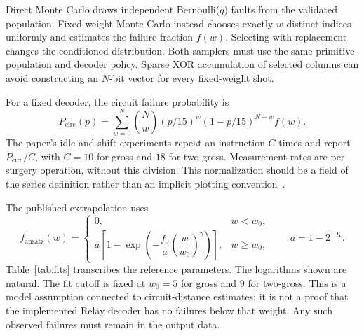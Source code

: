 \documentclass[11pt,a4paper]{article}
\begin{document}
Direct Monte Carlo draws independent Bernoulli($q$) faults from the validated population. Fixed-weight Monte Carlo instead chooses exactly $w$ distinct indices uniformly and estimates the failure fraction $f(w)$. Selecting with replacement changes the conditioned distribution. Both samplers must use the same primitive population and decoder policy. Sparse XOR accumulation of selected columns can avoid constructing an $N$-bit vector for every fixed-weight shot.

For a fixed decoder, the circuit failure probability is
\begin{equation}
 P_{\mathrm{circ}}(p)=\sum_{w=0}^N
 \binom Nw (p/15)^w(1-p/15)^{N-w}f(w).
 \label{eq:mixture}
\end{equation}
The paper's idle and shift experiments repeat an instruction $C$ times and report $P_{\mathrm{circ}}/C$, with $C=10$ for gross and $18$ for two-gross. Measurement rates are per surgery operation, without this division. This normalization should be a field of the series definition rather than an implicit plotting convention~\cite{tdg}.

The published extrapolation uses
\begin{equation}
 f_{\mathrm{ansatz}}(w)=
 \begin{cases}
 0,&w<w_0,\\[2pt]
 a\left[1-\exp\left(-\dfrac{f_0}{a}
 \left(\dfrac{w}{w_0}\right)^\gamma\right)\right],&w\geq w_0,
 \end{cases}
 \qquad a=1-2^{-K}.
 \label{eq:ansatz}
\end{equation}
Table~\ref{tab:fits} transcribes the reference parameters. The logarithms shown are natural. The fit cutoff is fixed at $w_0=5$ for gross and $9$ for two-gross. This is a model assumption connected to circuit-distance estimates; it is not a proof that the implemented Relay decoder has no failures below that weight. Any such observed failures must remain in the output data.
\end{document}
